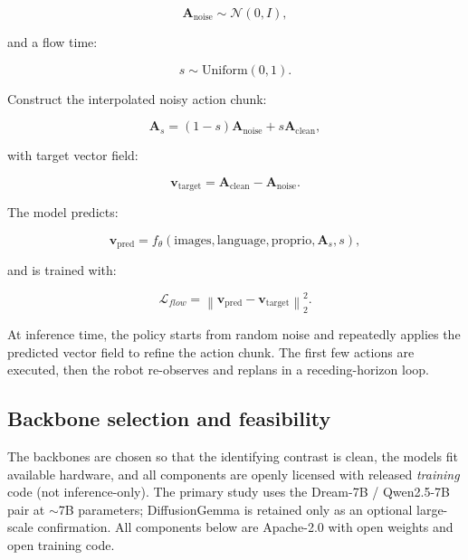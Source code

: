 \documentclass[11pt]{article}
\newcommand{\vect}[1]{\mathbf{#1}}
\newcommand{\Aclean}{\vect{A}_{\mathrm{clean}}}
\newcommand{\Anoise}{\vect{A}_{\mathrm{noise}}}
\newcommand{\As}{\vect{A}_{s}}
\newcommand{\vtarget}{\vect{v}_{\mathrm{target}}}
\newcommand{\vpred}{\vect{v}_{\mathrm{pred}}}
\begin{document}
\begin{equation}
    \Anoise \sim \mathcal{N}(0, I),
\end{equation}

and a flow time:

\begin{equation}
    s \sim \mathrm{Uniform}(0, 1).
\end{equation}

Construct the interpolated noisy action chunk:

\begin{equation}
    \As = (1-s)\Anoise + s\Aclean,
\end{equation}

with target vector field:

\begin{equation}
    \vtarget = \Aclean - \Anoise.
\end{equation}

The model predicts:

\begin{equation}
    \vpred = f_{\theta}(\text{images}, \text{language}, \text{proprio}, \As, s),
\end{equation}

and is trained with:

\begin{equation}
    \mathcal{L}_{flow} = \left\| \vpred - \vtarget \right\|_2^2.
\end{equation}

At inference time, the policy starts from random noise and repeatedly applies the predicted vector field to refine the action chunk. The first few actions are executed, then the robot re-observes and replans in a receding-horizon loop.

\subsection{Backbone selection and feasibility}
\label{sec:backbone-selection}

The backbones are chosen so that the identifying contrast is clean, the models fit available hardware, and all components are openly licensed with released \emph{training} code (not inference-only). The primary study uses the Dream-7B / Qwen2.5-7B pair at $\sim$7B parameters; DiffusionGemma is retained only as an optional large-scale confirmation. All components below are Apache-2.0 with open weights and open training code.
\end{document}
